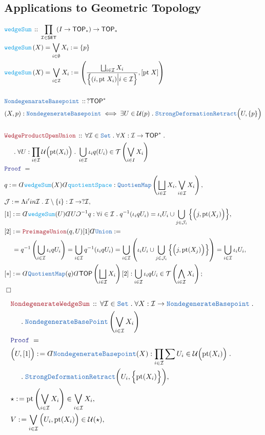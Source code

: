 \documentclass[12pt]{scrartcl}
\newcommand{\TYPE}[1]{\textcolor{NavyBlue}{\mathtt{#1}}}
\newcommand{\FUNC}[1]{\textcolor{Cerulean}{\mathtt{#1}}}
\newcommand{\LOGIC}[1]{\textcolor{Blue}{\mathtt{#1}}}
\newcommand{\THM}[1]{\textcolor{Maroon}{\mathtt{#1}}}
\renewcommand{\.}{\; . \;}
\newcommand{\de}{: \kern 0.1pc =}
\newcommand{\Act}[1]{\left( #1 \right)}
\newcommand{\Theorem}[2]{& \THM{#1} \, :: \, #2 \\ & \Proof = \\ }
\newcommand{\DeclareType}[2]{& \TYPE{#1} \, :: \, #2 \\}
\newcommand{\DefineType}[3]{& #1 : \TYPE{#2} \iff #3 \\}
\newcommand{\DeclareFunc}[2]{& \FUNC{#1} \, :: \, #2 \\}
\newcommand{\DefineNamedFunc}[4]{&  \FUNC{#1}\Act{#2} = #3 \de #4 \\}
\newcommand{\NewLine}{\\ & \kern 1pc}
\newcommand{\Page}[1]{ \begin{align*} #1 \end{align*}   }
\newcommand{ \bd }{ \ByDef }
\newcommand{\Set}{\TYPE{Set}}
\newcommand{\Say}[3]{& #1 \de #2 : #3, \\}
\newcommand{\SayIn}[3]{& #1 \de #2 \in #3, \\}
\newcommand{\Conclude}[3]{& #1 \de #2 : #3; \\}
\newcommand{\QED}{\; \square}
\newcommand{\EndProof}{& \QED \\}
\newcommand{\ByDef}{\rotatebox[origin=c]{-180}{$D$}}%
\newcommand{\ByConstr}{\rotatebox[origin=c]{-180}{$C$}}%
\newcommand{\Proof}{\LOGIC{Proof} \; }
\newcommand{\I}{\mathcal{I}}
\newcommand{\J}{\mathcal{J}}
\newcommand{\SET}{\mathsf{SET}}
\newcommand{\TOP}{\mathsf{TOP}}
\newcommand{\T}{\mathcal{T}}
\newcommand{\U}{\mathcal{U}}
\begin{document}
\subsection{Applications to Geometric Topology}
\Page{
	\DeclareFunc{wedgeSum}
	{
		\prod_{\I \in \SET} (I \to \TOP_*) \to \TOP_*
	}
	\DefineNamedFunc{wedgeSum}{X}{\bigvee_{i \in \emptyset} X_i }{ \{p\}   } 
	\DefineNamedFunc{wedgeSum}{X}{\bigvee_{i \in \I} X_i}
	{
		\left(\frac{\bigsqcup_{i \in \I} X_i}
		{
			\Big\{ ( i, \mathrm{pt} \; X_i) \Big| i \in \I  \Big\}
		},
		[\mathrm{pt} \; X] 
		\right)
	}
	\\
	\DeclareType{NondegenarateBasepoint}
	{
		?\TOP^*
	}
	\DefineType{(X,p)}{NondegenerateBasepoint}{ 
		\exists U \in \U(p) \. \TYPE{StrongDeformationRetract}\Big(U,\{p\}\Big)
	}
	\\
	\Theorem{WedgeProductOpenUnion}
	{
		\forall \I \in \Set \. 
		\forall X : \I \to \TOP^* \. 
		\NewLine \.
		\forall U : \prod_{i \in \I} \U\Big(\mathrm{pt}(X_i)\Big) \.
		\bigcup_{i \in \I} \iota_i q (U_i) \in \T\left( \bigvee_{i \in I} X_i \right)
	}
	\Say{q}{\bd \FUNC{wedgeSum}(X) \bd \FUNC{quotientSpace}}
	{\TYPE{QuotienMap}\left( \bigsqcup_{i \in \I} X_i,\bigvee_{i \in \I}X_i \right)}
	\Say{\J}{\Lambda i 'in \I \. \I \setminus \{i\} }{\I \to ?\I}
	\Say{[1]}{\bd \FUNC{wedgeSum}(U) \bd U \ByConstr^{-1} q}
	{
		\forall i \in \I \. 
		q^{-1}(\iota_i q U_i) = \iota_i U_i \cup \bigcup_{j \in \J_i} \Big\{ \Big( j, \mathrm{pt}(X_j) \Big) \Big\}  
	}
	\Say{[2]}{\THM{PreimageUnion}(q,U)[1] \bd \TYPE{Union}}
	{
		= \NewLine = 
		q^{-1}\left( \bigcup_{i \in \I} \iota_i q  U_i \right) =
		\bigcup_{i \in \I}  q^{-1}(\iota_i q U_i) = 
		\bigcup_{i \in \I} \left(   \iota_i U_i \cup \bigcup_{j \in \J_i} \Big\{ \Big( j, \mathrm{pt}(X_j) \Big) \Big\} \right)
		= 
		\bigcup_{i \in \I} \iota_i U_i
	}
	\Conclude{[*]}{\bd \TYPE{QuotientMap}(q) \bd \TOP\left( \bigsqcup_{i \in \I} X_i \right)[2] }
	{
		\bigcup_{i \in \I} \iota_i q U_i \in \T\left( \bigwedge_{i \in \I} X_i \right)
	}
	\EndProof
}\Page{
	\Theorem{NondegenerateWedgeSum}
	{
		\forall \I \in \Set  \.
		\forall X : \I \to \TYPE{NondegenerateBasepoint} \. \NewLine \. 
		\TYPE{NondegenerateBasePoint}\left(\bigvee_{i \in \I} X_i\right) 
	}
	\Say{\Big(U,[1]\Big)}
	{
		\bd \TYPE{NondegenerateBasepoint}(X)
	}
	{
		\prod_{i \in \I} \sum U_i \in \U\Big(\mathrm{pt}(X_i)\Big) \. \NewLine \.  
		\TYPE{StrongDeformationRetract}\bigg( U_i,\Big\{ \mathrm{pt}(X_i) \Big\}  \bigg)   
	}
	\SayIn{\star}{\mathrm{pt}\left(\bigvee_{i \in \I} X_i \right)}{\bigvee_{i \in \I} X_i}
	\SayIn{V}{\bigvee_{i \in \I} \Big(U_i,\mathrm{pt}(X_i)\Big)}{\U(\star)}    
}
\end{document}
